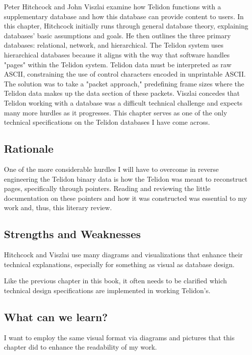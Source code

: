 \documentclass[sigconf]{acmart}
\begin{document}
Peter Hitchcock and John Viszlai examine how Telidon functions with a supplementary database and how this database can provide content to users. In this chapter, Hitchcock initially runs through general database theory, explaining databases' basic assumptions and goals. He then outlines the three primary databases: relational, network, and hierarchical. The Telidon system uses hierarchical databases because it aligns with the way that software handles "pages" within the Telidon system. Telidon data must be interpreted as raw ASCII, constraining the use of control characters encoded in unprintable ASCII. The solution was to take a "packet approach," predefining frame sizes where the Telidon data makes up the data section of these packets. Viszlai concedes that Telidon working with a database was a difficult technical challenge and expects many more hurdles as it progresses.
This chapter serves as one of the only technical specifications on the Telidon databases I have come across.

\subsection{Rationale}

One of the more considerable hurdles I will have to overcome in reverse engineering the Telidon binary data is how the Telidon was meant to reconstruct pages, specifically through pointers. Reading and reviewing the little documentation on these pointers and how it was constructed was essential to my work and, thus, this literary review. 

\subsection{Strengths and Weaknesses}

Hitchcock and Viszlai use many diagrams and visualizations that enhance their technical explanations, especially for something as visual as database design.

Like the previous chapter in this book, it often needs to be clarified which technical design specifications are implemented in working Telidon's.  

\subsection{What can we learn?}

I want to employ the same visual format via diagrams and pictures that this chapter did to enhance the readability of my work. 
\end{document}
